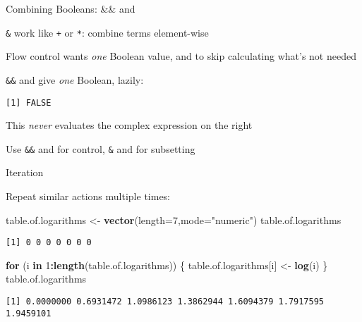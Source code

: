 \documentclass[8pt,ignorenonframetext,]{beamer}
\newenvironment{Shaded}{\begin{snugshade}}{\end{snugshade}}
\newcommand{\KeywordTok}[1]{\textcolor[rgb]{0.13,0.29,0.53}{\textbf{#1}}}
\newcommand{\DataTypeTok}[1]{\textcolor[rgb]{0.13,0.29,0.53}{#1}}
\newcommand{\DecValTok}[1]{\textcolor[rgb]{0.00,0.00,0.81}{#1}}
\newcommand{\StringTok}[1]{\textcolor[rgb]{0.31,0.60,0.02}{#1}}
\newcommand{\ControlFlowTok}[1]{\textcolor[rgb]{0.13,0.29,0.53}{\textbf{#1}}}
\newcommand{\OperatorTok}[1]{\textcolor[rgb]{0.81,0.36,0.00}{\textbf{#1}}}
\newcommand{\NormalTok}[1]{#1}
\begin{document}
\begin{frame}[fragile]{Combining Booleans: \&\& and
\textbar{}\textbar{}}

\texttt{\&} work \texttt{\textbar{}} like \texttt{+} or \texttt{*}:
combine terms element-wise

Flow control wants \emph{one} Boolean value, and to skip calculating
what's not needed

\texttt{\&\&} and \texttt{\textbar{}\textbar{}} give \emph{one} Boolean,
lazily:

\begin{Shaded}
\end{Shaded}

\begin{verbatim}
[1] FALSE
\end{verbatim}

This \emph{never} evaluates the complex expression on the right

Use \texttt{\&\&} and \texttt{\textbar{}\textbar{}} for control,
\texttt{\&} and \texttt{\textbar{}} for subsetting

\end{frame}

\begin{frame}[fragile]{Iteration}

Repeat similar actions multiple times:

\begin{Shaded}
\begin{Highlighting}[]
\NormalTok{table.of.logarithms <-}\StringTok{ }\KeywordTok{vector}\NormalTok{(}\DataTypeTok{length=}\DecValTok{7}\NormalTok{,}\DataTypeTok{mode=}\StringTok{"numeric"}\NormalTok{)}
\NormalTok{table.of.logarithms}
\end{Highlighting}
\end{Shaded}

\begin{verbatim}
[1] 0 0 0 0 0 0 0
\end{verbatim}

\begin{Shaded}
\begin{Highlighting}[]
\ControlFlowTok{for}\NormalTok{ (i }\ControlFlowTok{in} \DecValTok{1}\OperatorTok{:}\KeywordTok{length}\NormalTok{(table.of.logarithms)) \{}
\NormalTok{  table.of.logarithms[i] <-}\StringTok{ }\KeywordTok{log}\NormalTok{(i)}
\NormalTok{\}}
\NormalTok{table.of.logarithms}
\end{Highlighting}
\end{Shaded}

\begin{verbatim}
[1] 0.0000000 0.6931472 1.0986123 1.3862944 1.6094379 1.7917595 1.9459101
\end{verbatim}

\end{frame}
\end{document}
